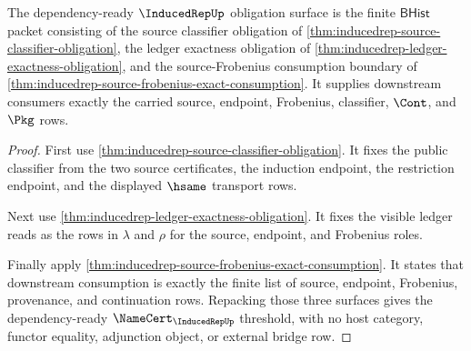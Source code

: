 \begin{theorem}
\label{thm:inducedrep-namecert-threshold-witness}
The dependency-ready $\InducedRepUp$ obligation surface is the finite
$\mathsf{BHist}$ packet consisting of the source classifier obligation of
\autoref{thm:inducedrep-source-classifier-obligation}, the ledger exactness
obligation of \autoref{thm:inducedrep-ledger-exactness-obligation}, and the
source-Frobenius consumption boundary of
\autoref{thm:inducedrep-source-frobenius-exact-consumption}. It supplies
downstream consumers exactly the carried source, endpoint, Frobenius,
classifier, $\Cont$, and $\Pkg$ rows.
\end{theorem}
\begin{proof}
First use \autoref{thm:inducedrep-source-classifier-obligation}. It fixes the
public classifier from the two source certificates, the induction endpoint,
the restriction endpoint, and the displayed $\hsame$ transport rows.

Next use \autoref{thm:inducedrep-ledger-exactness-obligation}. It fixes the
visible ledger reads as the rows in $\lambda$ and $\rho$ for the source,
endpoint, and Frobenius roles.

Finally apply \autoref{thm:inducedrep-source-frobenius-exact-consumption}.
It states that downstream consumption is exactly the finite list of source,
endpoint, Frobenius, provenance, and continuation rows. Repacking those
three surfaces gives the dependency-ready $\NameCert_{\InducedRepUp}$
threshold, with no host category, functor equality, adjunction object, or
external bridge row.
\end{proof}

